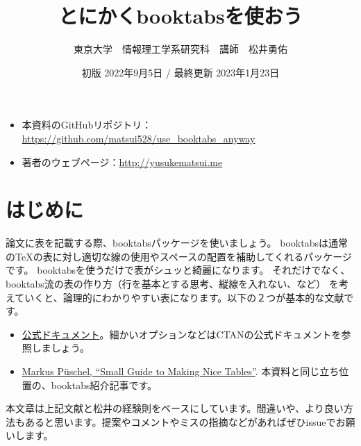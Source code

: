 \documentclass[uplatex,onecolumn,9pt,dvipdfmx]{jsarticle}
\begin{document}
\title{とにかくbooktabsを使おう}
\author{東京大学　情報理工学系研究科　講師　松井勇佑}
\date{初版 2022年9月5日 / 最終更新 2023年1月23日}
\maketitle

\begin{screen}
    \begin{itemize}
    \item 本資料のGitHubリポジトリ： \url{https://github.com/matsui528/use_booktabs_anyway}
    \item 著者のウェブページ：\url{http://yusukematsui.me}
    \end{itemize}
\end{screen}

\section{はじめに}

論文に表を記載する際、booktabsパッケージを使いましょう。
booktabsは通常のTeXの表に対し適切な線の使用やスペースの配置を補助してくれるパッケージです。
booktabsを使うだけで表がシュッと綺麗になります。
それだけでなく、booktabs流の表の作り方（行を基本とする思考、縦線を入れない、など）
を考えていくと、論理的にわかりやすい表になります。以下の２つが基本的な文献です。
\begin{itemize}
    \item \href{http://mirrors.ctan.org/macros/latex/contrib/booktabs/booktabs.pdf}{公式ドキュメント}。細かいオプションなどはCTANの公式ドキュメントを参照しましょう。
    \item \href{https://people.inf.ethz.ch/markusp/teaching/guides/guide-tables.pdf}{Markus P\"{u}schel, ``Small Guide to Making Nice Tables''}. 本資料と同じ立ち位置の、booktabs紹介記事です。
\end{itemize}
本文章は上記文献と松井の経験則をベースにしています。間違いや、より良い方法もあると思います。提案やコメントやミスの指摘などがあればぜひissueでお願いします。
\end{document}
